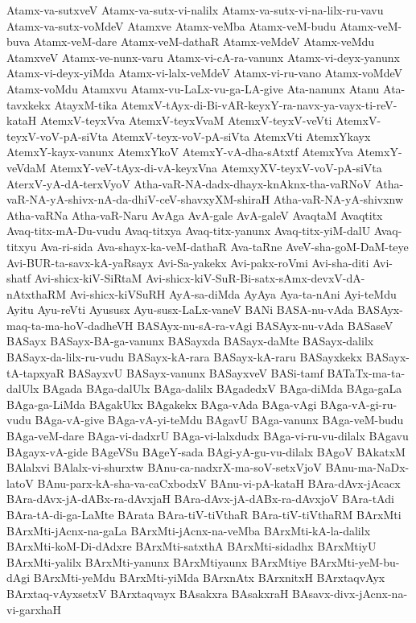 {Atamx-va-sutxveV
Atamx-va-sutx-vi-nalilx
Atamx-va-sutx-vi-na-lilx-ru-vavu
Atamx-va-sutx-voMdeV
Atamxve
Atamx-veMba
Atamx-veM-budu
Atamx-veM-buva
Atamx-veM-dare
Atamx-veM-dathaR
Atamx-veMdeV
Atamx-veMdu
AtamxveV
Atamx-ve-nunx-varu
Atamx-vi-cA-ra-vanunx
Atamx-vi-deyx-yanunx
Atamx-vi-deyx-yiMda
Atamx-vi-lalx-veMdeV
Atamx-vi-ru-vano
Atamx-voMdeV
Atamx-voMdu
Atamxvu
Atamx-vu-LaLx-vu-ga-LA-give
Ata-nanunx
Atanu
Ata-tavxkekx
AtayxM-tika
AtemxV-tAyx-di-Bi-vAR-keyxY-ra-navx-ya-vayx-ti-reV-kataH
AtemxV-teyxVva
AtemxV-teyxVvaM
AtemxV-teyxV-veVti
AtemxV-teyxV-voV-pA-siVta
AtemxV-teyx-voV-pA-siVta
AtemxVti
AtemxYkayx
AtemxY-kayx-vanunx
AtemxYkoV
AtemxY-vA-dha-sAtxtf
AtemxYva
AtemxY-veVdaM
AtemxY-veV-tAyx-di-vA-keyxVna
AtemxyXV-teyxV-voV-pA-siVta
AterxV-yA-dA-terxVyoV
Atha-vaR-NA-dadx-dhayx-knAknx-tha-vaRNoV
Atha-vaR-NA-yA-shivx-nA-da-dhiV-ceV-shavxyXM-shiraH
Atha-vaR-NA-yA-shivxnw
Atha-vaRNa
Atha-vaR-Naru
AvAga
AvA-gale
AvA-galeV
AvaqtaM
Avaqtitx
Avaq-titx-mA-Du-vudu
Avaq-titxya
Avaq-titx-yanunx
Avaq-titx-yiM-dalU
Avaq-titxyu
Ava-ri-sida
Ava-shayx-ka-veM-dathaR
Ava-taRne
AveV-sha-goM-DaM-teye
Avi-BUR-ta-savx-kA-yaRsayx
Avi-Sa-yakekx
Avi-pakx-roVmi
Avi-sha-diti
Avi-shatf
Avi-shicx-kiV-SiRtaM
Avi-shicx-kiV-SuR-Bi-satx-sAmx-devxV-dA-nAtxthaRM
Avi-shicx-kiVSuRH
AyA-sa-diMda
AyAya
Aya-ta-nAni
Ayi-teMdu
Ayitu
Ayu-reVti
Ayususx
Ayu-susx-LaLx-vaneV
BANi
BASA-nu-vAda
BASAyx-maq-ta-ma-hoV-dadheVH
BASAyx-nu-sA-ra-vAgi
BASAyx-nu-vAda
BASaseV
BASayx
BASayx-BA-ga-vanunx
BASayxda
BASayx-daMte
BASayx-dalilx
BASayx-da-lilx-ru-vudu
BASayx-kA-rara
BASayx-kA-raru
BASayxkekx
BASayx-tA-tapxyaR
BASayxvU
BASayx-vanunx
BASayxveV
BASi-tamf
BATaTx-ma-ta-dalUlx
BAgada
BAga-dalUlx
BAga-dalilx
BAgadedxV
BAga-diMda
BAga-gaLa
BAga-ga-LiMda
BAgakUkx
BAgakekx
BAga-vAda
BAga-vAgi
BAga-vA-gi-ru-vudu
BAga-vA-give
BAga-vA-yi-teMdu
BAgavU
BAga-vanunx
BAga-veM-budu
BAga-veM-dare
BAga-vi-dadxrU
BAga-vi-lalxdudx
BAga-vi-ru-vu-dilalx
BAgavu
BAgayx-vA-gide
BAgeVSu
BAgeY-sada
BAgi-yA-gu-vu-dilalx
BAgoV
BAkatxM
BAlalxvi
BAlalx-vi-shurxtw
BAnu-ca-nadxrX-ma-soV-setxVjoV
BAnu-ma-NaDx-latoV
BAnu-parx-kA-sha-va-caCxbodxV
BAnu-vi-pA-kataH
BAra-dAvx-jAcacx
BAra-dAvx-jA-dABx-ra-dAvxjaH
BAra-dAvx-jA-dABx-ra-dAvxjoV
BAra-tAdi
BAra-tA-di-ga-LaMte
BArata
BAra-tiV-tiVthaR
BAra-tiV-tiVthaRM
BArxMti
BArxMti-jAcnx-na-gaLa
BArxMti-jAcnx-na-veMba
BArxMti-kA-la-dalilx
BArxMti-koM-Di-dAdxre
BArxMti-satxthA
BArxMti-sidadhx
BArxMtiyU
BArxMti-yalilx
BArxMti-yanunx
BArxMtiyaunx
BArxMtiye
BArxMti-yeM-bu-dAgi
BArxMti-yeMdu
BArxMti-yiMda
BArxnAtx
BArxnitxH
BArxtaqvAyx
BArxtaq-vAyxsetxV
BArxtaqvayx
BAsakxra
BAsakxraH
BAsavx-divx-jAcnx-na-vi-garxhaH
}
